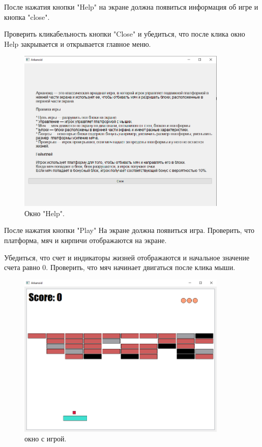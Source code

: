 После нажатия кнопки "Help" на экране должна появиться информация об игре и кнопка "close".

Проверить кликабельность кнопки "Close" и убедиться, что после клика окно Help закрывается и открывается главное меню.

\begin{figure} [h!]
  \centering
  \graphicspath{ {img/} }
  \includegraphics[width=10cm]{image/2.png}
  \caption{Окно "Help". }
  \label{fig:image}
\end{figure}


После нажатия кнопки "Play" На экране должна появиться игра. Проверить, что платформа, мяч и кирпичи отображаются на экране. 

Убедиться, что счет и индикаторы жизней отображаются и начальное значение счета равно 0. 
Проверить, что мяч начинает двигаться после клика мыши.

\begin{figure} [h!]
  \centering
  \graphicspath{ {img/} }
  \includegraphics[width=10cm]{image/3.png}
  \caption{окно с игрой. }
  \label{fig:image}
\end{figure}



